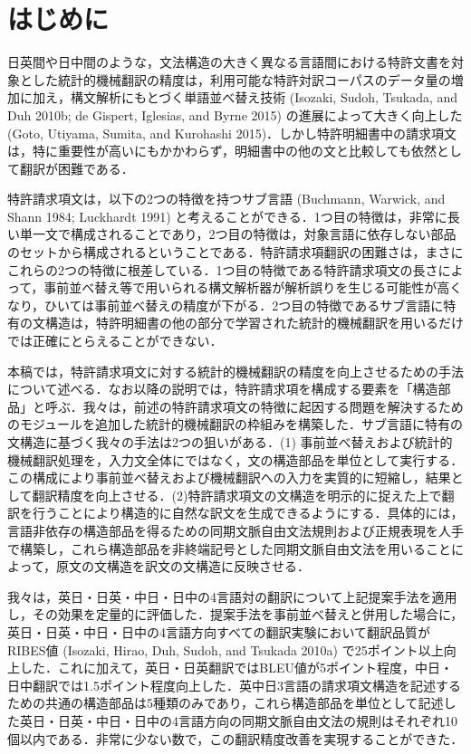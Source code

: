 \documentclass[japanese]{jnlp_1.4}
\begin{document}
\maketitle


\section{はじめに}

日英間や日中間のような，文法構造の大きく異なる言語間における特許文書を対象とした統計的機械翻訳の精度は，利用可能な特許対訳コーパスのデータ量の増加に加え，構文解析にもとづく単語並べ替え技術 (Isozaki, Sudoh, Tsukada, and Duh 2010b; de Gispert, Iglesias, and Byrne 2015) の進展によって大きく向上した (Goto, Utiyama, Sumita, and Kurohashi 2015)．しかし特許明細書中の請求項文は，特に重要性が高いにもかかわらず，明細書中の他の文と比較しても依然として翻訳が困難である．

特許請求項文は，以下の2つの特徴を持つサブ言語 (Buchmann, Warwick, and Shann 1984; Luckhardt 
1991) と考えることができる．1つ目の特徴は，非常に長い単一文で構成されることであり，2つ目の特徴は，対象言語に依存しない部品のセットから構成されるということである．特許請求項翻訳の困難さは，まさにこれらの2つの特徴に根差している．1つ目の特徴である特許請求項文の長さによって，事前並べ替え等で用いられる構文解析器が解析誤りを生じる可能性が高くなり，ひいては事前並べ替えの精度が下がる．2つ目の特徴であるサブ言語に特有の文構造は，特許明細書の他の部分で学習された統計的機械翻訳を用いるだけでは正確にとらえることができない．

本稿では，特許請求項文に対する統計的機械翻訳の精度を向上させるための手法について述べる．なお以降の説明では，特許請求項を構成する要素を「構造部品」と呼ぶ．我々は，前述の特許請求項文の特徴に起因する問題を解決するためのモジュールを追加した統計的機械翻訳の枠組みを構築した．サブ言語に特有の文構造に基づく我々の手法は2つの狙いがある．(1) 
事前並べ替えおよび統計的機械翻訳処理を，入力文全体にではなく，文の構造部品を単位として実行する．この構成により事前並べ替えおよび機械翻訳への入力を実質的に短縮し，結果として翻訳精度を向上させる．(2)特許請求項文の文構造を明示的に捉えた上で翻訳を行うことにより構造的に自然な訳文を生成できるようにする．具体的には，言語非依存の構造部品を得るための同期文脈自由文法規則および正規表現を人手で構築し，これら構造部品を非終端記号とした同期文脈自由文法を用いることによって，原文の文構造を訳文の文構造に反映させる．

我々は，英日・日英・中日・日中の4言語対の翻訳について上記提案手法を適用し，その効果を定量的に評価した．提案手法を事前並べ替えと併用した場合に，英日・日英・中日・日中の4言語方向すべての翻訳実験において翻訳品質がRIBES値 (Isozaki, 
Hirao, Duh, Sudoh, and Tsukada 
2010a) で25ポイント以上向上した．これに加えて，英日・日英翻訳ではBLEU値が5ポイント程度，中日・日中翻訳では1.5ポイント程度向上した．英中日3言語の請求項文構造を記述するための共通の構造部品は5種類のみであり，これら構造部品を単位として記述した英日・日英・中日・日中の4言語方向の同期文脈自由文法の規則はそれぞれ10個以内である．非常に少ない数で，この翻訳精度改善を実現することができた．
\end{document}
